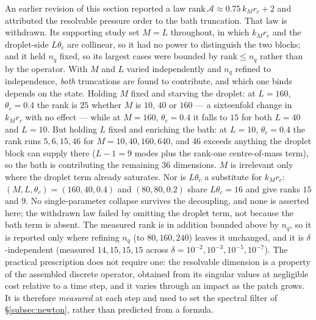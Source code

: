 An earlier revision of this section reported a law $\mathrm{rank}\,\mathcal A\approx0.75\,k_Mr_c+2$ and attributed the resolvable pressure order to the bath truncation. That law is withdrawn. Its supporting study set $M=L$ throughout, in which $k_Mr_c$ and the droplet-side $L\theta_c$ are collinear, so it had no power to distinguish the two blocks; and it held $n_q$ fixed, so its largest cases were bounded by $\mathrm{rank}\le n_q$ rather than by the operator. With $M$ and $L$ varied independently and $n_q$ refined to independence, \emph{both} truncations are found to contribute, and which one binds depends on the state. Holding $M$ fixed and starving the droplet: at $L=160$, $\theta_c=0.4$ the rank is $25$ whether $M$ is $10$, $40$ or $160$ --- a sixteenfold change in $k_Mr_c$ with no effect --- while at $M=160$, $\theta_c=0.4$ it falls to $15$ for both $L=40$ and $L=10$. But holding $L$ fixed and enriching the bath: at $L=10$, $\theta_c=0.4$ the rank runs $5,6,15,46$ for $M=10,40,160,640$, and $46$ exceeds anything the droplet block can supply there ($L-1=9$ modes plus the rank-one centre-of-mass term), so the bath is contributing the remaining $36$ dimensions. $M$ is irrelevant only where the droplet term already saturates. Nor is $L\theta_c$ a substitute for $k_Mr_c$: $(M,L,\theta_c)=(160,40,0.4)$ and $(80,80,0.2)$ share $L\theta_c=16$ and give ranks $15$ and $9$. No single-parameter collapse survives the decoupling, and none is asserted here; the withdrawn law failed by omitting the droplet term, not because the bath term is absent. The measured rank is in addition bounded above by $n_q$, so it is reported only where refining $n_q$ (to $80,160,240$) leaves it unchanged, and it is $\delta$-independent (measured $14,15,15,15$ across $\delta=10^{-2},10^{-3},10^{-5},10^{-7}$). The practical prescription does not require one: the resolvable dimension is a property of the assembled discrete operator, obtained from its singular values at negligible cost relative to a time step, and it varies through an impact as the patch grows. It is therefore \emph{measured} at each step and used to set the spectral filter of \S\ref{subsec:newton}, rather than predicted from a formula.

